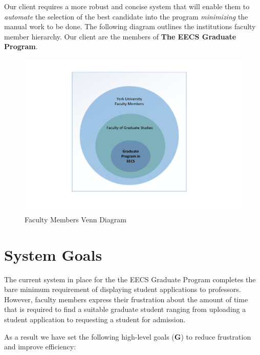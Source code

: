 \documentclass[fontsize=12pt,paper=letter,twoside]{scrartcl}
\begin{document}
Our client requires a more robust and concise system that will enable them to \emph{automate} the selection of the best candidate into the program \emph{minimizing} the manual work to be done. The following diagram outlines the institutions faculty member hierarchy. Our client are the members of \textbf{The EECS Graduate Program}.

\begin{figure}[!htb]
\begin{center}
\includegraphics[width=.65\textwidth]{images/faculty_venn_diagram.pdf}
\end{center}
\caption{Faculty Members Venn Diagram}
\label{fig:faculty_venn_diagram}
\end{figure}

\newpage
\section{System Goals}

The current system in place for the the EECS Graduate Program completes the bare minimum requirement of displaying student applications to professors. However, faculty members express their frustration about the amount of time that is required to find a suitable graduate student ranging from uploading a student application to requesting a student for admission.

\bigskip

\noindent As a result we have set the following high-level goals (\textbf{G}) to reduce frustration and improve efficiency:

\smallskip
\end{document}
